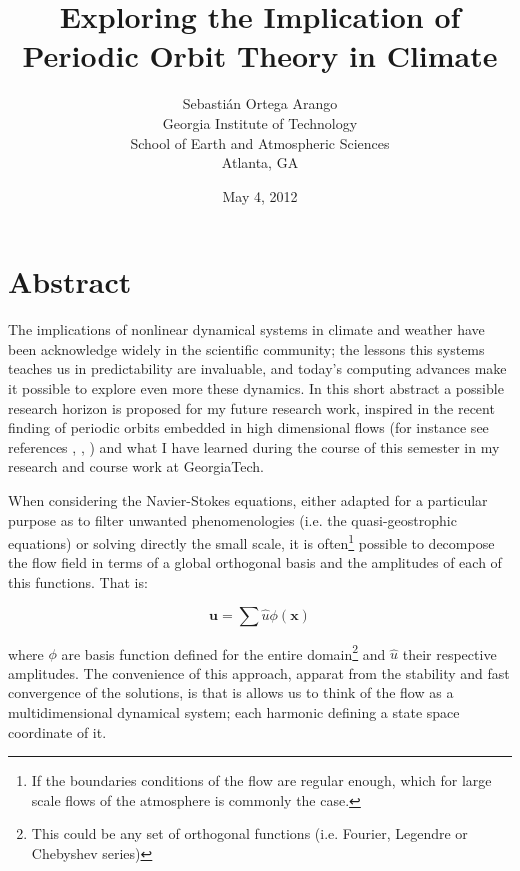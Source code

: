 \documentclass{article}%
\begin{document}
\title{Exploring the Implication of Periodic Orbit Theory in Climate}
\author{Sebasti\'{a}n Ortega Arango
\\Georgia Institute of Technology
\\School of Earth and Atmospheric Sciences
\\Atlanta, GA}
\date{May 4, 2012}
\maketitle

\section*{Abstract}
The implications of nonlinear dynamical systems in climate and weather have been
acknowledge widely in the scientific community; the lessons this systems teaches us
in predictability are invaluable, and today's computing advances make it possible to explore
even more these dynamics. In this short abstract a possible research horizon is proposed for
my future research work, inspired in the recent finding of periodic orbits embedded in high
dimensional flows (for instance see references \cite{GHCW07}, \cite{CvWiAv12}, \cite{Visw07b}) and what I have learned during the course of this semester in my research
and course work at GeorgiaTech.

When considering the Navier-Stokes equations, either adapted for a particular
purpose as to filter unwanted phenomenologies (i.e. the quasi-geostrophic equations) or
solving directly the small scale, it is often\footnote{
If the boundaries conditions of the flow are regular enough, which for large scale flows of the atmosphere is
commonly the case.
}
possible to decompose the flow field in terms of a global orthogonal basis and the
amplitudes of each of this functions. That is:

\begin{equation}
\textbf{u}=\sum \widehat{u} \phi (\textbf{x})
\end{equation}

where $\phi$ are basis function defined for the entire domain\footnote{
This could be any set of orthogonal functions (i.e.
Fourier, Legendre or Chebyshev series)
}
and $\widehat{u}$ their respective amplitudes. The convenience of this approach, apparat
from the stability and fast convergence of the solutions, is that is allows us to think
of the flow as a multidimensional dynamical system; each harmonic defining a state
space coordinate of it.
\end{document}
